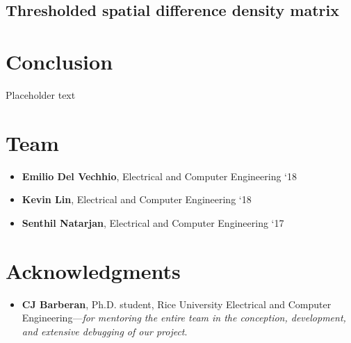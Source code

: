 \documentclass[journal]{IEEEtran}
\begin{document}
\subsection{Thresholded spatial difference density matrix}


\section{Conclusion}
Placeholder text

\section*{Team}
\begin{itemize}
	\item \textbf{Emilio Del Vechhio}, Electrical and Computer Engineering `18
	\item \textbf{Kevin Lin}, Electrical and Computer Engineering `18
	\item \textbf{Senthil Natarjan}, Electrical and Computer Engineering `17
\end{itemize}

\section*{Acknowledgments}
\begin{itemize}
	\item \textbf{CJ Barberan}, Ph.D. student, Rice University Electrical and Computer Engineering---\textit{for mentoring the entire team in the conception, development, and extensive debugging of our project}.
\end{itemize}
\end{document}
